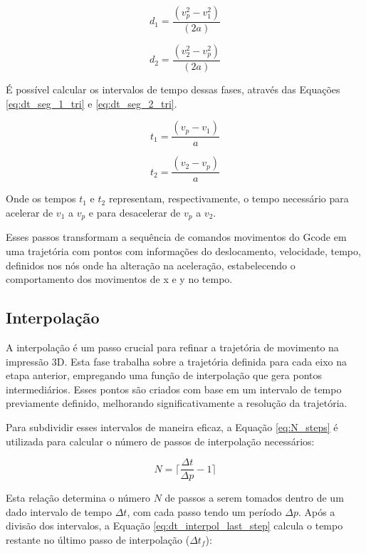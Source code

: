 \begin{equation}
    \label{eq:des_seg_1_tri}
    d_1 = \frac{(v_p^2-v_1^2)}{(2 a)}
\end{equation}

\begin{equation}
    \label{eq:des_seg_2_tri}
    d_2 = \frac{(v_2^2-v_p^2)}{(2 a)}
\end{equation}

É possível calcular os intervalos de tempo dessas fases, através das Equações \ref{eq:dt_seg_1_tri} e \ref{eq:dt_seg_2_tri}.

\begin{equation}
    \label{eq:dt_seg_1_tri}
    t_1 = \frac{(v_p-v_1)}{a}
\end{equation}

\begin{equation}
    \label{eq:dt_seg_2_tri}
    t_2 = \frac{(v_2-v_p)}{a}
\end{equation}

Onde os tempos \(t_1\) e \(t_2\) representam, respectivamente, o tempo necessário para acelerar de \(v_1\) a \(v_p\) e para desacelerar de \(v_p\) a \(v_2\). 

Esses passos transformam a sequência de comandos movimentos do Gcode em uma trajetória com pontos com informações do deslocamento, velocidade, tempo, definidos nos nós onde ha alteração na aceleração, estabelecendo o comportamento dos movimentos de x e y no tempo.

\subsection{Interpolação}
A interpolação é um passo crucial para refinar a trajetória de movimento na impressão 3D. Esta fase trabalha sobre a trajetória definida para cada eixo na etapa anterior, empregando uma função de interpolação que gera pontos intermediários. Esses pontos são criados com base em um intervalo de tempo previamente definido, melhorando significativamente a resolução da trajetória.

Para subdividir esses intervalos de maneira eficaz, a Equação \ref{eq:N_steps} é utilizada para calcular o número de passos de interpolação necessários:

\begin{equation}
    \label{eq:N_steps}
    N = \lceil\frac{\Delta t}{\Delta p}-1\rceil
\end{equation}

Esta relação determina o número \( N \) de passos a serem tomados dentro de um dado intervalo de tempo \( \Delta t \), com cada passo tendo um período \( \Delta p \). Após a divisão dos intervalos, a Equação \ref{eq:dt_interpol_last_step} calcula o tempo restante no último passo de interpolação (\(\Delta t_f\)):

